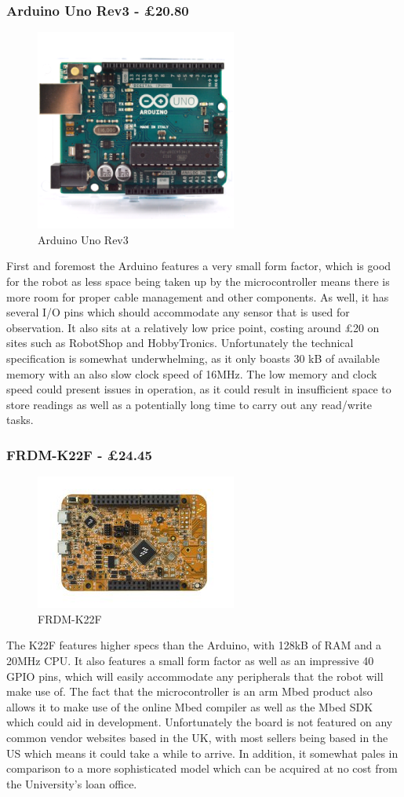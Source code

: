 					\subsubsection{Arduino Uno Rev3 - \pounds{20.80}}
					\begin{figure}[h]
						\centering
						\includegraphics[width=.3\linewidth]{ANALYSIS/arduinounorev3.png}
						\caption{Arduino Uno Rev3}
						\label{fig:arduinounorev3}
					\end{figure}
					First and foremost the Arduino features a very small form factor, which is good for the robot as less space being taken up by the microcontroller means there is more room for proper cable management and other components. As well, it has several I/O pins which should accommodate any sensor that is used for observation. It also sits at a relatively low price point, costing around \pounds{20} on sites such as RobotShop and HobbyTronics. Unfortunately the technical specification is somewhat underwhelming, as it only boasts 30 kB of available memory with an also slow clock speed of 16MHz. The low memory and clock speed could present issues in operation, as it could result in insufficient space to store readings as well as a potentially long time to carry out any read/write tasks.
				
					\subsubsection{FRDM-K22F - \pounds{24.45}}
					\begin{figure}[h]
						\centering
						\includegraphics[width=.3\linewidth]{ANALYSIS/k22f.png}
						\caption{FRDM-K22F}
						\label{fig:k22f}
					\end{figure}
					The K22F features higher specs than the Arduino, with 128kB of RAM and a 20MHz CPU. It also features a small form factor as well as an impressive 40 GPIO pins, which will easily accommodate any peripherals that the robot will make use of. The fact that the microcontroller is an arm Mbed product also allows it to make use of the online Mbed compiler as well as the Mbed SDK which could aid in development. Unfortunately the board is not featured on any common vendor websites based in the UK, with most sellers being based in the US which means it could take a while to arrive. In addition, it somewhat pales in comparison to a more sophisticated model which can be acquired at no cost from the University's loan office.
					

